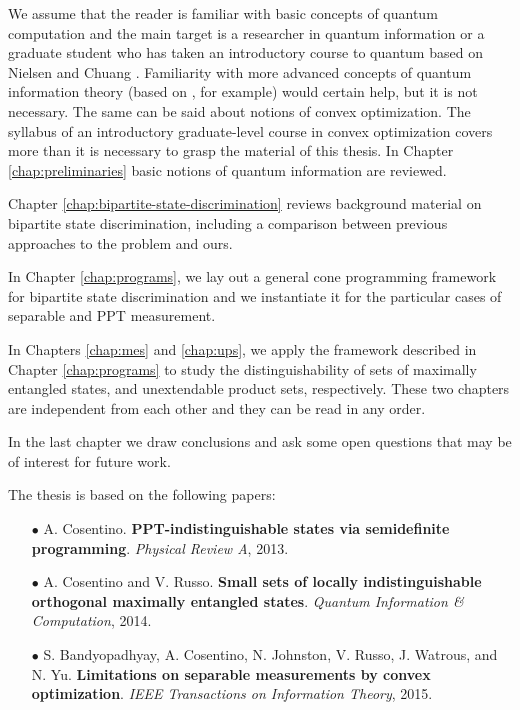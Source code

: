 We assume that the reader is familiar with basic concepts of quantum computation and 
the main target is a researcher in quantum information or a graduate student 
who has taken an introductory course to quantum based on Nielsen and Chuang \cite{Nielsen11}.
Familiarity with more advanced concepts of quantum information theory (based 
on \cite{Watrous15}, for example) would certain help, but it is not necessary.
The same can be said about notions of convex optimization. The syllabus of an introductory 
graduate-level course in convex optimization covers more than it is necessary to grasp
the material of this thesis.
In Chapter \ref{chap:preliminaries} basic notions of quantum information are reviewed. 

Chapter \ref{chap:bipartite-state-discrimination} reviews background material 
on bipartite state discrimination, including a comparison between previous approaches 
to the problem and ours.

In Chapter \ref{chap:programs}, we lay out a general cone programming framework
for bipartite state discrimination and we instantiate it for the particular cases
of separable and PPT measurement. 

In Chapters \ref{chap:mes} and \ref{chap:ups}, we apply the framework described in Chapter 
\ref{chap:programs} to study the distinguishability of sets of maximally entangled states, 
and unextendable product sets, respectively.
These two chapters are independent from each other and they can be read in any order.

In the last chapter we draw conclusions and ask some open questions that may be
of interest for future work. 

The thesis is based on the following papers:
\begin{itemize}

\item[$\bullet$]
 A. Cosentino. 
\textbf{PPT-indistinguishable states via semidefinite programming}. 
\textit{Physical Review A}, 2013.
\cite{Cosentino13}

\item[$\bullet$]
A. Cosentino and V. Russo.
\textbf{Small sets of locally indistinguishable orthogonal maximally entangled states}. 
\textit{Quantum Information \& Computation},  2014.
\cite{Cosentino14}

\item[$\bullet$] 
S. Bandyopadhyay, A. Cosentino, N. Johnston, V. Russo, J. Watrous, and N. Yu. 
\textbf{Limitations on separable measurements by convex optimization}. 
\textit{IEEE Transactions on Information Theory}, 2015.
\cite{Bandyopadhyay15}

\end{itemize}